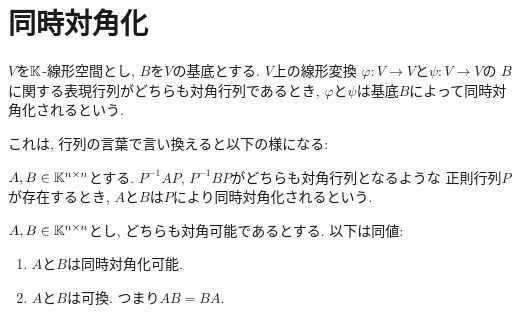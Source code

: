 \section{同時対角化}
\begin{definition}
$V$を$\mathbb{K}$-線形空間とし,
$B$を$V$の基底とする.
$V$上の線形変換
$\varphi\colon V\to V$と$\psi\colon V\to V$の
$B$に関する表現行列がどちらも対角行列であるとき,
$\varphi$と$\psi$は基底$B$によって同時対角化されるという.
\end{definition}
これは, 行列の言葉で言い換えると以下の様になる:
\begin{definition}
$A,B\in\mathbb{K}^{n\times n}$とする.
$P^{-1}AP$, $P^{-1}BP$がどちらも対角行列となるような
正則行列$P$が存在するとき,
$A$と$B$は$P$により同時対角化されるという.
\end{definition}
\begin{prop}
$A,B\in\mathbb{K}^{n\times n}$とし,
どちらも対角可能であるとする.
以下は同値:
\begin{enumerate}
\item $A$と$B$は同時対角化可能.
\item $A$と$B$は可換. つまり$AB=BA$.
\end{enumerate}
\end{prop}
